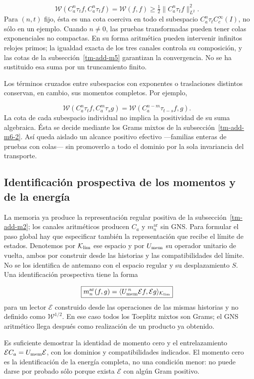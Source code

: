 \[
\boxed{\mathscr W(C_a^n\tau_t f,C_a^n\tau_t f)
=\mathscr W(f,f)
\geq\tfrac12\|C_a^n\tau_t f\|_{L^2}^2.}
\]
Para \((n,t)\) fijo, ésta es una cota coerciva en todo el subespacio \(C_a^n\tau_t C_c^\infty(I)\), no sólo en un ejemplo. Cuando \(n\ne0\), las pruebas transformadas pueden tener colas exponenciales no compactas. En su forma aritmética pueden intervenir infinitos relojes primos; la igualdad exacta de los tres canales controla su composición, y las cotas de la subsección~\ref{tm-add-m5} garantizan la convergencia. No se ha sustituido esa suma por un truncamiento finito.

Los términos cruzados entre subespacios con exponentes o traslaciones distintos conservan, en cambio, sus momentos completos. Por ejemplo,

\[
\mathscr W(C_a^n\tau_t f,C_a^m\tau_s g)
=\mathscr W(C_a^{n-m}\tau_{t-s}f,g).
\]
La cota de cada subespacio individual no implica la positividad de su suma algebraica. Ésta se decide mediante los Grams mixtos de la subsección~\ref{tm-add-m6-2}. Así queda aislado un alcance positivo efectivo —familias enteras de pruebas con colas— sin promoverlo a todo el dominio por la sola invariancia del transporte.


\subsection{Identificación prospectiva de los momentos y de la energía}
\label{tm-add-m7}
La memoria ya produce la representación regular positiva de la
subsección~\ref{tm-add-m2}; los canales aritméticos producen \(C_a\)
y \(m_n^{\mathrm{ar}}\) sin GNS. Para formular el paso global hay que
especificar también la representación que recibe el límite de estados.
Denotemos por \(\mathcal K_{\rm lim}\) ese espacio y por
\(U_{\rm mem}\) su operador unitario de vuelta, ambos por construir
desde las historias y las compatibilidades del límite. No se los
identifica de antemano con el espacio regular y su desplazamiento \(S\).
Una identificación prospectiva tiene la forma

\[
\boxed{m_n^{\mathrm{ar}}(f,g)
=\langle U_{\rm mem}^{\,n}\mathcal E f,\mathcal E g\rangle_{\mathcal K_{\rm lim}}}
\]
para un lector \(\mathcal E\) construido desde las operaciones de las mismas historias y no definido como \(\mathscr W^{1/2}\). En ese caso todos los Toeplitz mixtos son Grams; el GNS aritmético llega después como realización de un producto ya obtenido.

Es suficiente demostrar la identidad de momento cero y el entrelazamiento
\(\mathcal E C_a=U_{\rm mem}\mathcal E\), con los dominios y
compatibilidades indicados. El momento cero es la identificación de la
energía completa, no una condición menor: no puede darse por probado
sólo porque exista \(\mathcal E\) con algún Gram positivo.

